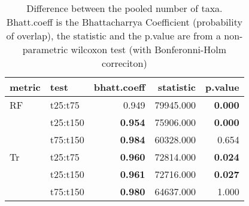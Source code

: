 \begin{table}[ht]
\centering
\begin{tabular}{llr|rr}
  \hline
metric & test & bhatt.coeff & statistic & p.value \\ 
  \hline
RF & t25:t75 & 0.949 & 79945.000 & \textbf{0.000} \\ 
   & t25:t150 & \textbf{0.954} & 75906.000 & \textbf{0.000} \\ 
   & t75:t150 & \textbf{0.984} & 60328.000 & 0.654 \\ 
  Tr & t25:t75 & \textbf{0.960} & 72814.000 & \textbf{0.024} \\ 
   & t25:t150 & \textbf{0.961} & 72716.000 & \textbf{0.027} \\ 
   & t75:t150 & \textbf{0.980} & 64637.000 & 1.000 \\ 
   \hline
\end{tabular}
\caption{Difference between the pooled number of taxa. Bhatt.coeff is the Bhattacharrya Coefficient (probability of overlap), the statistic and the p.value are from a non-parametric wilcoxon test (with Bonferonni-Holm correciton)} 
\label{Tab_pooledstaxa_test}
\end{table}
